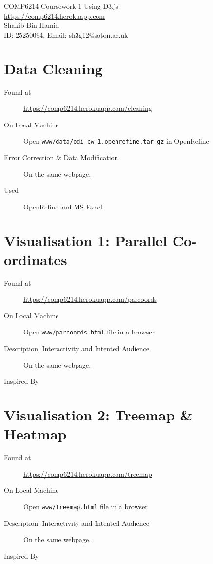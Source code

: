 \documentclass[10pt]{article}
\begin{document}
\begin{center}
\Large{
COMP6214 Coursework 1 Using D3.js\\
\url{https://comp6214.herokuapp.com}
}
\\

Shakib-Bin Hamid\\ID: 25250094, Email: sh3g12@soton.ac.uk

\end{center}

\section{Data Cleaning}

\begin{description}
\item[Found at ] \url{https://comp6214.herokuapp.com/cleaning}
\item[On Local Machine] Open \texttt{www/data/odi-cw-1.openrefine.tar.gz} in OpenRefine
\item[Error Correction \& Data Modification] On the same webpage.
\item[Used] OpenRefine\cite{openrefineteam} and MS Excel.
\end{description}

\section{Visualisation 1: Parallel Co-ordinates}

\begin{description}
\item[Found at ] \url{https://comp6214.herokuapp.com/parcoords}
\item[On Local Machine] Open \texttt{www/parcoords.html} file in a browser
\item[Description, Interactivity and Intented Audience] On the same webpage.
\item[Inspired By] \cite{kaichang}
\end{description}

\section{Visualisation 2: Treemap \& Heatmap}

\begin{description}
\item[Found at ] \url{https://comp6214.herokuapp.com/treemap}
\item[On Local Machine] Open \texttt{www/treemap.html} file in a browser
\item[Description, Interactivity and Intented Audience] On the same webpage.
\item[Inspired By] \cite{mikebostock}
\end{description}
\end{document}
